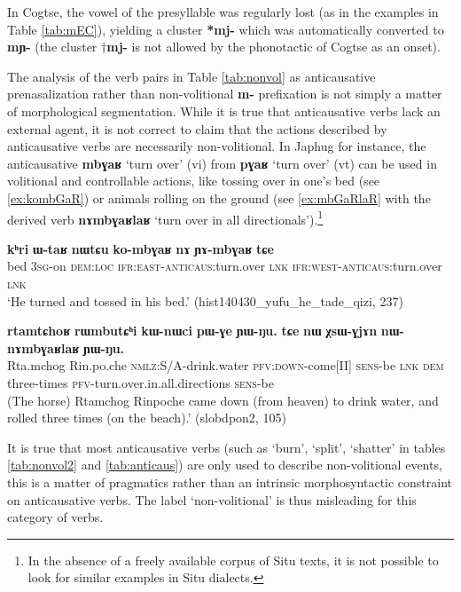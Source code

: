 \documentclass[oneside,a4paper,11pt]{article}
\newcommand{\ipa}[1]{\textbf{{\phon\mbox{#1}}}} %
\begin{document}
In Cogtse, the vowel of the presyllable was regularly lost (as in the examples in Table \ref{tab:mEC}), yielding a cluster \ipa{*mj-} which was automatically converted to \ipa{mɲ-} (the cluster $\dagger$\ipa{mj-} is not allowed by the phonotactic of Cogtse as an onset).

The analysis of the verb pairs in Table \ref{tab:nonvol} as anticausative prenasalization rather than non-volitional \ipa{m-} prefixation is not simply a matter of morphological segmentation. While it is true that anticausative verbs lack an external agent, it is not correct to claim that the actions described by anticausative verbs are necessarily non-volitional. In Japhug for instance, the anticausative \ipa{mbɣaʁ} `turn over' (vi) from \ipa{pɣaʁ} `turn over' (vt) can be used in volitional and controllable actions, like tossing over in one's bed (see \ref{ex:kombGaR}) or animals rolling on the ground (see \ref{ex:mbGaRlaR} with  the derived verb \ipa{nɤmbɣaʁlaʁ} `turn over in all directionals').\footnote{In the absence of a freely available corpus of Situ texts, it is not possible to look for similar examples in Situ dialects.}

 \begin{exe}
\ex \label{ex:kombGaR}
\gll \ipa{kʰri} 	\ipa{ɯ-taʁ} 	\ipa{nɯtɕu} 	\ipa{ko-mbɣaʁ} 	\ipa{nɤ} 	\ipa{ɲɤ-mbɣaʁ} 	\ipa{tɕe}  \\
bed \textsc{3sg}-on \textsc{dem:loc} \textsc{ifr:east-anticaus}:turn.over \textsc{lnk} \textsc{ifr:west-anticaus}:turn.over \textsc{lnk} \\
\glt `He turned and tossed in his bed.' (hist140430_yufu_he_tade_qizi, 237)
\end{exe}

 \begin{exe}
\ex \label{ex:mbGaRlaR}
\gll \ipa{rtamtɕhoʁ} 	\ipa{rɯmbutɕʰi} 	\ipa{kɯ-nɯci} 	\ipa{pɯ-ɣe} 	\ipa{ɲɯ-ŋu.} \ipa{tɕe} 	\ipa{nɯ} 	\ipa{χsɯ-ɣjɤn} 	\ipa{nɯ-nɤmbɣaʁlaʁ} 	\ipa{ɲɯ-ŋu.}  \\
 Rta.mchog Rin.po.che \textsc{nmlz}:S/A-drink.water \textsc{pfv:down}-come[II]  \textsc{sens}-be \textsc{lnk} \textsc{dem} three-times \textsc{pfv}-turn.over.in.all.directions  \textsc{sens}-be \\
\glt  (The horse) Rtamchog Rinpoche came down (from heaven) to drink water, and rolled three times (on the beach).' (slobdpon2, 105)
 \end{exe}

It is true that most anticausative verbs (such as `burn', `split', `shatter' in tables \ref{tab:nonvol2} and \ref{tab:anticaus}) are only used to describe non-volitional events, this is a matter of pragmatics rather than an intrinsic morphosyntactic constraint on anticausative verbs. The label `non-volitional' is thus misleading for this category of verbs.
\end{document}

